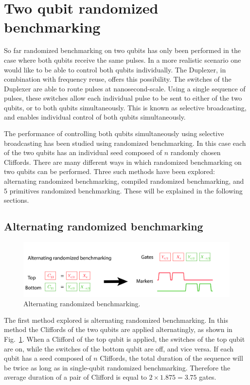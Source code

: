     \section{Two qubit randomized benchmarking}
      \label{Two qubit randomized benchmarking}
      So far randomized benchmarking on two qubits has only been performed in the case where both qubits receive the same pulses. In a more realistic scenario one would like to be able to control both qubits individually. The Duplexer, in combination with frequency reuse, offers this possibility. The switches of the Duplexer are able to route pulses at nanosecond-scale. Using a single sequence of pulses, these switches allow each individual pulse to be sent to either of the two qubits, or to both qubits simultaneously. This is known as selective broadcasting, and enables individual control of both qubits simultaneously.

      The performance of controlling both qubits simultaneously using selective broadcasting has been studied using randomized benchmarking. In this case each of the two qubits has an individual seed composed of $n$ randomly chosen Cliffords. There are many different ways in which randomized benchmarking on two qubits can be performed. Three such methods have been explored: alternating randomized benchmarking, compiled randomized benchmarking, and 5 primitives randomized benchmarking. These will be explained in the following sections.

      \subsection{Alternating randomized benchmarking}
        \label{ssec:alternating randomized benchmarking}

        \begin{figure}[h]
          \centering
          \includegraphics[width=\textwidth]{Figures/Randomized benchmarking/alternating RB.jpg}
          \caption{Alternating randomized benchmarking.}
          \label{fig:alternating RB schematic}
        \end{figure}

        The first method explored is alternating randomized benchmarking. In this method the Cliffords of the two qubits are applied alternatingly, as shown in Fig.~\ref{fig:alternating RB schematic}. When a Clifford of the top qubit is applied, the switches of the top qubit are on, while the switches of the bottom qubit are off, and vice versa. If each qubit has a seed composed of $n$ Cliffords, the total duration of the sequence will be twice as long as in single-qubit randomized benchmarking. Therefore the average duration of a pair of Clifford is equal to $2 \times 1.875 = 3.75$ gates.


